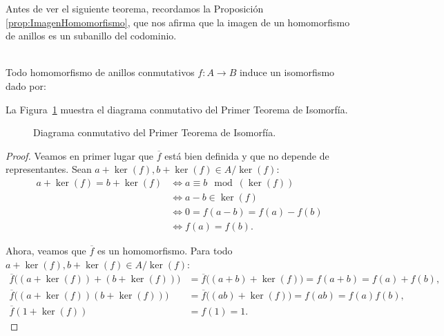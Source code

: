 Antes de ver el siguiente teorema, recordamos la Proposición \ref{prop:ImagenHomomorfismo}, que nos afirma que la imagen de un homomorfismo de anillos es un subanillo del codominio.

\begin{teo}
    \ \\
    Todo homomorfismo de anillos conmutativos $f:A\rightarrow B$ induce un isomorfismo dado por:
    
    La Figura~\ref{fig:primerTeoremaIsomorfia} muestra el diagrama conmutativo del Primer Teorema de Isomorfía.
    \begin{figure}[h]
        \centering
        \caption{Diagrama conmutativo del Primer Teorema de Isomorfía.}
        \label{fig:primerTeoremaIsomorfia}
    \end{figure}
\begin{proof}
    Veamos en primer lugar que $\overline{f}$ está bien definida y que no depende de representantes. Sean $a + \ker(f), b + \ker(f) \in A/\ker(f)$:
    \begin{align*}
        a + \ker(f) = b + \ker(f) 
        &\iff a \equiv b \mod(\ker(f)) \\
        &\iff a - b \in \ker(f) \\
        &\iff 0 = f(a - b) = f(a) - f(b) \\
        &\iff f(a) = f(b).
    \end{align*}

    Ahora, veamos que $\overline{f}$ es un homomorfismo. Para todo $a + \ker(f), b + \ker(f) \in A/\ker(f)$:
    \begin{align*}
        \overline{f}\bigl((a + \ker(f)) + (b + \ker(f))\bigr) 
        &= \overline{f}\bigl((a + b) + \ker(f)\bigr) = f(a + b) = f(a) + f(b), \\
        \overline{f}\bigl((a + \ker(f))(b + \ker(f))\bigr) 
        &= \overline{f}\bigl((ab) + \ker(f)\bigr) = f(ab) = f(a)f(b), \\
        \overline{f}(1 + \ker(f)) 
        &= f(1) = 1.
    \end{align*}


\end{proof}
\end{teo}
